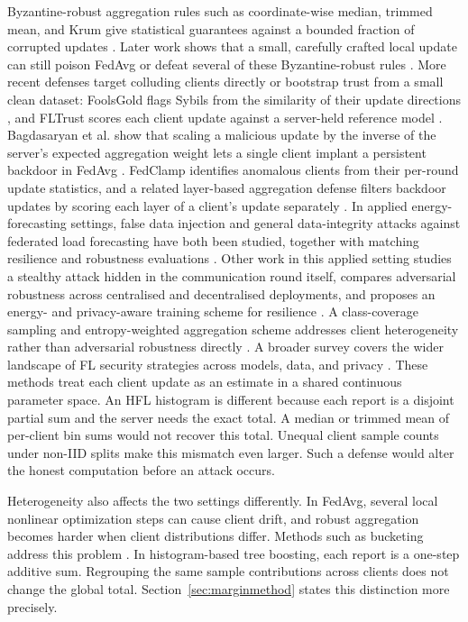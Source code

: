 \documentclass[11pt]{article}
\begin{document}
Byzantine-robust aggregation rules such as coordinate-wise median, trimmed mean, and Krum give statistical guarantees against a bounded fraction of corrupted updates \cite{yin2018byzantine,blanchard2017krum}. Later work shows that a small, carefully crafted local update can still poison FedAvg or defeat several of these Byzantine-robust rules \cite{bhagoji2019analyzing,fang2020local}. More recent defenses target colluding clients directly or bootstrap trust from a small clean dataset: FoolsGold flags Sybils from the similarity of their update directions \cite{fung2018foolsgold}, and FLTrust scores each client update against a server-held reference model \cite{cao2021fltrust}. Bagdasaryan et al. show that scaling a malicious update by the inverse of the server's expected aggregation weight lets a single client implant a persistent backdoor in FedAvg \cite{bagdasaryan2020backdoor}. FedClamp identifies anomalous clients from their per-round update statistics, and a related layer-based aggregation defense filters backdoor updates by scoring each layer of a client's update separately \cite{manzoor2022fedclamp,manzoor2023defending}. In applied energy-forecasting settings, false data injection and general data-integrity attacks against federated load forecasting have both been studied, together with matching resilience and robustness evaluations \cite{shabbir2024resilience,shabbir2024robustness}. Other work in this applied setting studies a stealthy attack hidden in the communication round itself, compares adversarial robustness across centralised and decentralised deployments, and proposes an energy- and privacy-aware training scheme for resilience \cite{manzoor2025novel,manzoor2024centralised,manzoor2024enhanced}. A class-coverage sampling and entropy-weighted aggregation scheme addresses client heterogeneity rather than adversarial robustness directly \cite{chen2026class}. A broader survey covers the wider landscape of FL security strategies across models, data, and privacy \cite{manzoor2024survey}. These methods treat each client update as an estimate in a shared continuous parameter space. An HFL histogram is different because each report is a disjoint partial sum and the server needs the exact total. A median or trimmed mean of per-client bin sums would not recover this total. Unequal client sample counts under non-IID splits make this mismatch even larger. Such a defense would alter the honest computation before an attack occurs.

Heterogeneity also affects the two settings differently. In FedAvg, several local nonlinear optimization steps can cause client drift, and robust aggregation becomes harder when client distributions differ. Methods such as bucketing address this problem \cite{karimireddy2022bucketing}. In histogram-based tree boosting, each report is a one-step additive sum. Regrouping the same sample contributions across clients does not change the global total. Section~\ref{sec:marginmethod} states this distinction more precisely.
\end{document}
